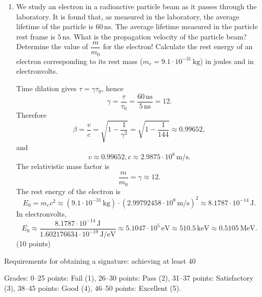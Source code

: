 \documentclass[12pt]{letter}
\begin{document}
\begin{enumerate}
\bigskip
\item We study an electron in a radioactive particle beam as it passes through the laboratory. It is found that, as measured in the laboratory, the average lifetime of the particle is $60\,\text{ns}$. The average lifetime measured in the particle rest frame is $5\,\text{ns}$. What is the propagation velocity of the particle beam? Determine the value of $\dfrac{m}{m_0}$ for the electron! Calculate the rest energy of an electron corresponding to its rest mass ($m_e=9.1\cdot10^{-31}\,\text{kg}$) in joules and in electronvolts. \

Time dilation gives $\tau=\gamma\tau_0$, hence
$$ \gamma=\frac{\tau}{\tau_0}=\frac{60\,\text{ns}}{5\,\text{ns}}=12. $$
Therefore
$$ \beta=\frac{v}{c}=\sqrt{1-\frac{1}{\gamma^{2}}}=\sqrt{1-\frac{1}{144}}\approx 0.99652, $$
and
$$ v\approx 0.99652,c \approx 2.9875\cdot10^{8}\,\text{m/s}. $$
The relativistic mass factor is
$$\frac{m}{m_0}=\gamma\approx 12. $$
The rest energy of the electron is
$$ E_{0}=m_e c^{2}\approx (9.1\cdot10^{-31}\,\text{kg})\cdot(2.99792458\cdot10^{8}\,\text{m/s})^{2}
\approx 8.1787\cdot10^{-14}\,\text{J}. $$
In electronvolts,
$$ E_{0} \approx \frac{8.1787\cdot10^{-14}\,\text{J}}{1.602176634\cdot10^{-19}\,\text{J/eV}}
\approx 5.1047\cdot10^{5}\,\text{eV}\approx 510.5\,\text{keV}\approx 0.5105\,\text{MeV}. $$
\hfill (10 points)

\end{enumerate}


Requirements for obtaining a signature: achieving at least 40%

Grades: 0–25 points: Fail (1), 26–30 points: Pass (2), 31–37 points: Satisfactory (3), 38–45 points: Good (4), 46–50 points: Excellent (5).

\end{document}
